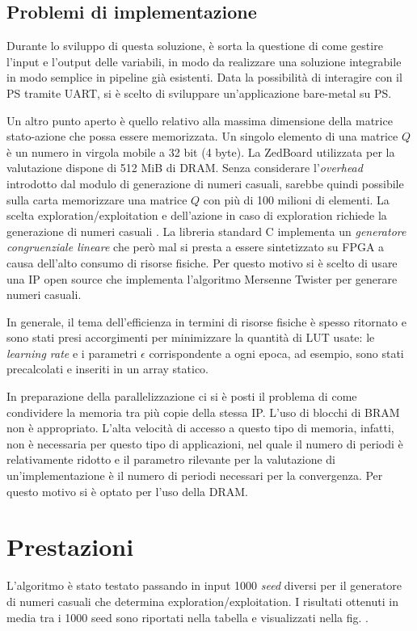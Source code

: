 \documentclass{article}
\begin{document}
\subsection{Problemi di implementazione}
Durante lo sviluppo di questa soluzione, è sorta la questione di come gestire l'input e l'output delle variabili, in modo da realizzare una soluzione integrabile in modo semplice in pipeline già esistenti. 
Data la possibilità di interagire con il PS tramite UART, si è scelto di sviluppare un'applicazione bare-metal su PS. 

Un altro punto aperto è quello relativo alla massima dimensione della matrice stato-azione che possa essere memorizzata. 
Un singolo elemento di una matrice $Q$ è un numero in virgola mobile a 32 bit (4 byte).
La ZedBoard utilizzata per la valutazione dispone di 512 MiB di DRAM.
Senza considerare l'\emph{overhead} introdotto dal modulo di generazione di numeri casuali, sarebbe quindi possibile sulla carta memorizzare una matrice $Q$ con più di 100 milioni di elementi. 
La scelta exploration/exploitation e dell'azione in caso di exploration richiede la generazione di numeri casuali \citep{sutton_reinforcement_2018}.
La libreria standard C implementa un \emph{generatore congruenziale lineare} che però mal si presta a essere sintetizzato su FPGA a causa dell'alto consumo di risorse fisiche. 
Per questo motivo si è scelto di usare una IP open source \citep{fedorko_wfedorkomersenne-twister-hls_2018} che implementa l'algoritmo Mersenne Twister per generare numeri casuali.

In generale, il tema dell'efficienza in termini di risorse fisiche è spesso ritornato e sono stati presi accorgimenti per minimizzare la quantità di LUT usate: le \emph{learning rate} e i parametri $\epsilon$ corrispondente a ogni epoca, ad esempio, sono stati precalcolati e inseriti in un array statico. 

In preparazione della parallelizzazione ci si è posti il problema di come condividere la memoria tra più copie della stessa IP. 
L'uso di blocchi di BRAM non è appropriato. 
L'alta velocità di accesso a questo tipo di memoria, infatti, non è necessaria per questo tipo di applicazioni, nel quale il numero di periodi è relativamente ridotto e il parametro rilevante per la valutazione di un'implementazione è il numero di periodi necessari per la convergenza.
Per questo motivo si è optato per l'uso della DRAM.

\section{Prestazioni}
L'algoritmo è stato testato passando in input 1000 \emph{seed} diversi per il generatore di numeri casuali che determina exploration/exploitation.
I risultati ottenuti in media tra i 1000 seed sono riportati nella tabella  e visualizzati nella fig. .
\end{document}
